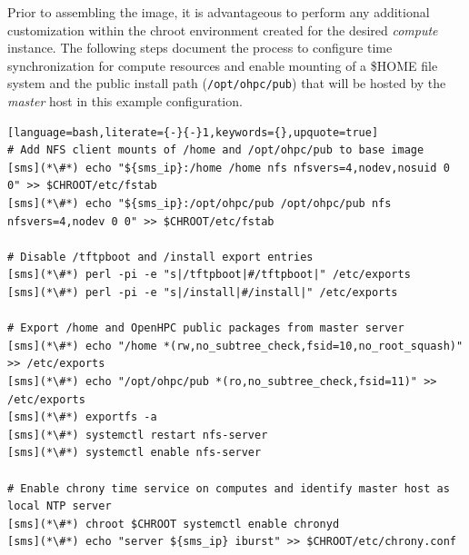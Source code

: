 Prior to assembling the image, it is advantageous to perform any additional
customization within the chroot environment created for the desired {\em
 compute} instance. The following steps document the process to configure time
synchronization for compute resources and enable \NFS{}
mounting of a \$HOME file system and the public \OHPC{} install path
(\texttt{/opt/ohpc/pub}) that will be hosted by the {\em master} host in this
example configuration.

\vspace*{0.15cm}
\begin{lstlisting}[language=bash,literate={-}{-}1,keywords={},upquote=true]
# Add NFS client mounts of /home and /opt/ohpc/pub to base image
[sms](*\#*) echo "${sms_ip}:/home /home nfs nfsvers=4,nodev,nosuid 0 0" >> $CHROOT/etc/fstab
[sms](*\#*) echo "${sms_ip}:/opt/ohpc/pub /opt/ohpc/pub nfs nfsvers=4,nodev 0 0" >> $CHROOT/etc/fstab

# Disable /tftpboot and /install export entries
[sms](*\#*) perl -pi -e "s|/tftpboot|#/tftpboot|" /etc/exports
[sms](*\#*) perl -pi -e "s|/install|#/install|" /etc/exports

# Export /home and OpenHPC public packages from master server
[sms](*\#*) echo "/home *(rw,no_subtree_check,fsid=10,no_root_squash)" >> /etc/exports
[sms](*\#*) echo "/opt/ohpc/pub *(ro,no_subtree_check,fsid=11)" >> /etc/exports
[sms](*\#*) exportfs -a
[sms](*\#*) systemctl restart nfs-server
[sms](*\#*) systemctl enable nfs-server

# Enable chrony time service on computes and identify master host as local NTP server
[sms](*\#*) chroot $CHROOT systemctl enable chronyd
[sms](*\#*) echo "server ${sms_ip} iburst" >> $CHROOT/etc/chrony.conf

\end{lstlisting}
